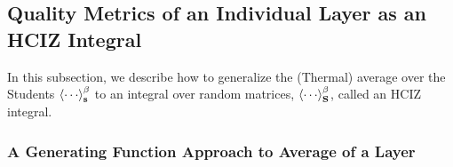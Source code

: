 \subsection{Quality Metrics of an Individual Layer as an HCIZ Integral}
\label{sxn:matgen_quality_hciz}

In this subsection, we describe how to generalize the (Thermal) average over the Students $\THRMAVG{\cdots}$ to an 
integral over random \Student matrices, $\THRMAVGIZ{\cdots}$, called an HCIZ integral.

\subsubsection{A Generating Function Approach to Average \QualitySquared of a Layer}
\label{sxn:matgen_quality_hciz_A}

